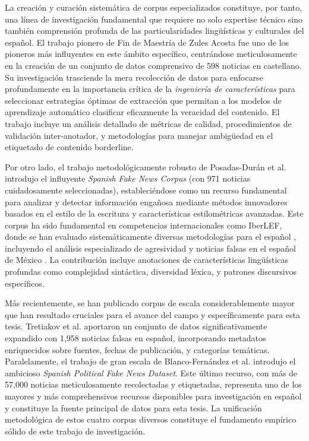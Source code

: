 La creación y curación sistemática de corpus especializados constituye, por tanto, una línea de investigación fundamental que requiere no solo expertise técnico sino también comprensión profunda de las particularidades lingüísticas y culturales del español. El trabajo pionero de Fin de Maestría de Zules Acosta \cite{acosta2019construccion} fue uno de los pioneros más influyentes en este ámbito específico, centrándose meticulosamente en la creación de un conjunto de datos comprensivo de 598 noticias en castellano. Su investigación trasciende la mera recolección de datos para enfocarse profundamente en la importancia crítica de la \textit{ingeniería de características} para seleccionar estrategias óptimas de extracción que permitan a los modelos de aprendizaje automático clasificar eficazmente la veracidad del contenido. El trabajo incluye un análisis detallado de métricas de calidad, procedimientos de validación inter-anotador, y metodologías para manejar ambigüedad en el etiquetado de contenido borderline.

Por otro lado, el trabajo metodológicamente robusto de Posadas-Durán et al. \cite{posadas2019detection} introdujo el influyente \textit{Spanish Fake News Corpus} (con 971 noticias cuidadosamente seleccionadas), estableciéndose como un recurso fundamental para analizar y detectar información engañosa mediante métodos innovadores basados en el estilo de la escritura y características estilométricas avanzadas. Este corpus ha sido fundamental en competencias internacionales como IberLEF, donde se han evaluado sistemáticamente diversas metodologías para el español \cite{gomez2021overview}, incluyendo el análisis especializado de agresividad y noticias falsas en el español de México \cite{aragon2020overview}. La contribución incluye anotaciones de características lingüísticas profundas como complejidad sintáctica, diversidad léxica, y patrones discursivos específicos.

Más recientemente, se han publicado corpus de escala considerablemente mayor que han resultado cruciales para el avance del campo y específicamente para esta tesis. Tretiakov et al. \cite{tretiakov2022detection} aportaron un conjunto de datos significativamente expandido con 1,958 noticias falsas en español, incorporando metadatos enriquecidos sobre fuentes, fechas de publicación, y categorías temáticas. Paralelamente, el trabajo de gran escala de Blanco-Fernández et al. \cite{blanco2024enhancing} introdujo el ambicioso \textit{Spanish Political Fake News Dataset}. Este último recurso, con más de 57,000 noticias meticulosamente recolectadas y etiquetadas, representa uno de los mayores y más comprehensivos recursos disponibles para investigación en español y constituye la fuente principal de datos para esta tesis. La unificación metodológica de estos cuatro corpus diversos constituye el fundamento empírico sólido de este trabajo de investigación.

